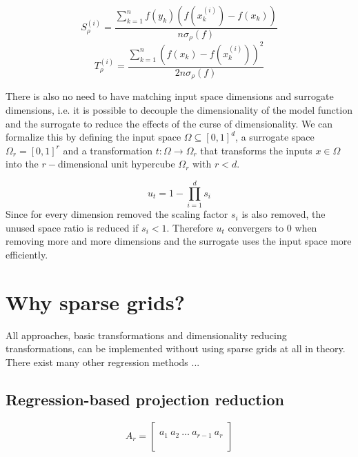\documentclass[
  a4paper,  %
  twoside,  %
  bibliography=totoc,
  headsepline,
  cleardoublepage=empty,
  parskip=half,
  draft=false
]{scrbook}
\begin{document}
\begin{equation}
S_{\rho}^{(i)}=\frac{\sum_{k=1}^n f(y_k) (f(x_k^{(i)}) - f(x_k))}{n \sigma_{\rho}(f)}
\end{equation}
\begin{equation}
T_{\rho}^{(i)}=\frac{\sum_{k=1}^n (f(x_k) - f(x_k^{(i)}))^2}{2n \sigma_{\rho}(f)}
\end{equation}


There is also no need to have matching input space dimensions and surrogate dimensions, i.e. it is possible to decouple the dimensionality of the model function and the surrogate to reduce the effects of the curse of dimensionality.
We can formalize this by defining the input space $\Omega \subseteq [0,1]^d$, a surrogate space $\Omega_r=[0,1]^r$ and a transformation $t \colon \Omega \to \Omega_r$ that transforms the inputs $x \in \Omega$ into the $r-$dimensional unit hypercube $\Omega_r$ with $r < d$.

\begin{equation}
u_t = 1 - \prod_{i=1}^d s_i
\end{equation}
Since for every dimension removed the scaling factor $s_i$ is also removed, the unused space ratio is reduced if $s_i < 1$.
Therefore $u_t$ convergers to $0$ when removing more and more dimensions and the surrogate uses the input space more efficiently.

\section{Why sparse grids?}

All approaches, basic transformations and dimensionality reducing transformations, can be implemented without using sparse grids at all in theory.
There exist many other regression methods ...



\subsection{Regression-based projection reduction}

\begin{equation}
A_r=\begin{bmatrix}
  \\
    a_1 ~ a_2 ~ \dots ~ a_{r-1} ~ a_r\\
    \\
  \end{bmatrix}
\label{basis}
\end{equation}
\end{document}
